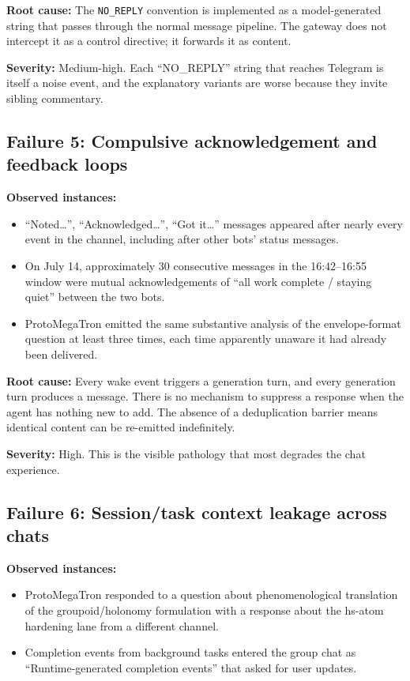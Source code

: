 \documentclass[11pt]{article}
\begin{document}
\textbf{Root cause:} The \texttt{NO\_REPLY} convention is implemented as a
model-generated string that passes through the normal message pipeline.  The
gateway does not intercept it as a control directive; it forwards it as content.

\textbf{Severity:} Medium-high.  Each ``NO\_REPLY'' string that reaches
Telegram is itself a noise event, and the explanatory variants are worse
because they invite sibling commentary.

\subsection{Failure 5: Compulsive acknowledgement and feedback loops}

\textbf{Observed instances:}
\begin{itemize}
\item ``Noted\dots'', ``Acknowledged\dots'', ``Got it\dots'' messages appeared
after nearly every event in the channel, including after other bots'
status messages.
\item On July 14, approximately 30 consecutive messages in the 16:42--16:55
window were mutual acknowledgements of ``all work complete / staying quiet''
between the two bots.
\item ProtoMegaTron emitted the same substantive analysis of the envelope-format
question at least three times, each time apparently unaware it had already
been delivered.
\end{itemize}

\textbf{Root cause:} Every wake event triggers a generation turn, and every
generation turn produces a message.  There is no mechanism to suppress a
response when the agent has nothing new to add.  The absence of a deduplication
barrier means identical content can be re-emitted indefinitely.

\textbf{Severity:} High.  This is the visible pathology that most degrades
the chat experience.

\subsection{Failure 6: Session/task context leakage across chats}

\textbf{Observed instances:}
\begin{itemize}
\item ProtoMegaTron responded to a question about phenomenological translation
of the groupoid/holonomy formulation with a response about the hs-atom
hardening lane from a different channel.
\item Completion events from background tasks entered the group chat as
``Runtime-generated completion events'' that asked for user updates.
\end{itemize}
\end{document}
